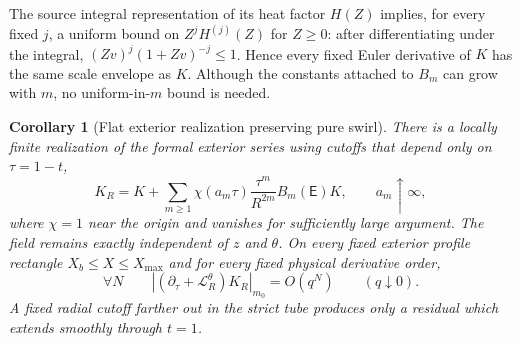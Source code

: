 \documentclass[aps,prd,reprint,superscriptaddress,nofootinbib,floatfix]{revtex4-2}
\newtheorem{corollary}[theorem]{Corollary}
\theoremstyle{definition}
\theoremstyle{remark}
\newcommand{\cL}{\mathcal{L}}
\newcommand{\Eul}{\mathsf E}
\begin{document}
The source integral representation of its heat factor $H(Z)$ implies, for every fixed $j$, a uniform bound on $Z^jH^{(j)}(Z)$ for $Z\ge0$: after differentiating under the integral, $(Zv)^j(1+Zv)^{-j}\le1$. Hence every fixed Euler derivative of $K$ has the same scale envelope as $K$. Although the constants attached to $B_m$ can grow with $m$, no uniform-in-$m$ bound is needed.

\begin{corollary}[Flat exterior realization preserving pure swirl]\label{cor:extborel}
	There is a locally finite realization of the formal exterior series using cutoffs that depend only on $\tau=1-t$,
	\begin{equation}
		K_R=K+\sum_{m\ge1}\chi(a_m\tau)
		\frac{\tau^m}{R^{2m}}B_m(\Eul)K,
		\qquad a_m\uparrow\infty,
		\label{eq:KRborel}
	\end{equation}
	where $\chi=1$ near the origin and vanishes for sufficiently large argument.  The field remains exactly independent of $z$ and $\theta$.  On every fixed exterior profile rectangle $X_b\le X\le X_{\max}$ and for every fixed physical derivative order,
	\begin{equation}
		\forall N\qquad
		|(\partial_\tau+\cL_R^\theta)K_R|_{m_0}=O(q^N)
		\qquad(q\downarrow0).
		\label{eq:extflat}
	\end{equation}
	A fixed radial cutoff farther out in the strict tube produces only a residual which extends smoothly through $t=1$.
\end{corollary}
\end{document}
